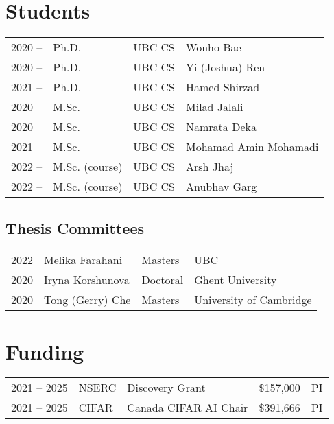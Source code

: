 \documentclass[11pt,sans]{moderncv}
\begin{document}
\section{Students}
\begin{tabular}{l@{\hskip .2in}l@{\hskip .2in}l@{\hskip .2in}l@{\hskip .2in}l}
    2020 -- & Ph.D. & UBC CS & Wonho Bae &\\
    2020 -- & Ph.D. & UBC CS & Yi (Joshua) Ren &\\
    2021 -- & Ph.D. & UBC CS & Hamed Shirzad &\\
    2020 -- & M.Sc. & UBC CS & Milad Jalali &\\
    2020 -- & M.Sc. & UBC CS & Namrata Deka &\\
    2021 -- & M.Sc. & UBC CS & \multicolumn{2}{l}{Mohamad Amin Mohamadi} \\
    2022 -- & M.Sc. (course) & UBC CS & Arsh Jhaj \\
    2022 -- & M.Sc. (course) & UBC CS & Anubhav Garg \\
\end{tabular}

\subsection{Thesis Committees}
\begin{tabular}{l@{\hskip .2in}l@{\hskip .2in}l@{\hskip .2in}l}
    2022 & Melika Farahani  & Masters  & UBC \\
    2020 & Iryna Korshunova & Doctoral & Ghent University \\
    2020 & Tong (Gerry) Che & Masters  & University of Cambridge
\end{tabular}

\section{Funding}
\begin{tabular}{l@{\hskip .2in}l@{\hskip .2in}l@{\hskip .2in}l@{\hskip .2in}l}
  2021 -- 2025 & NSERC & Discovery Grant & \$157,000 & PI \\
  2021 -- 2025 & CIFAR & Canada CIFAR AI Chair & \$391,666 & PI \\
\end{tabular}
\end{document}
